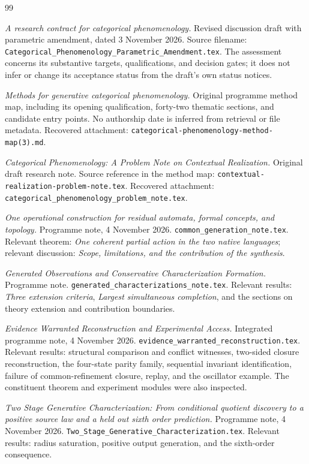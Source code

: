 \documentclass[11pt]{article}
\begin{document}
\begin{thebibliography}{99}

\emph{A research contract for categorical phenomenology.}
Revised discussion draft with parametric amendment, dated 3 November 2026.
Source filename: \texttt{Categorical\_Phenomenology\_Parametric\_Amendment.tex}.
The assessment concerns its substantive targets, qualifications, and decision gates; it does not infer or change its acceptance status from the draft's own status notices.

\emph{Methods for generative categorical phenomenology.}
Original programme method map, including its opening qualification, forty-two thematic sections, and candidate entry points. No authorship date is inferred from retrieval or file metadata.
Recovered attachment: \texttt{categorical-phenomenology-method-map(3).md}.

\emph{Categorical Phenomenology: A Problem Note on Contextual Realization.}
Original draft research note. Source reference in the method map:
\texttt{contextual-realization-problem-note.tex}.
Recovered attachment: \texttt{categorical\_phenomenology\_problem\_note.tex}.

\emph{One operational construction for residual automata, formal concepts, and topology.}
Programme note, 4 November 2026.
\texttt{common\_generation\_note.tex}.
Relevant theorem: \emph{One coherent partial action in the two native languages}; relevant discussion: \emph{Scope, limitations, and the contribution of the synthesis}.

\emph{Generated Observations and Conservative Characterization Formation.}
Programme note.
\texttt{generated\_characterizations\_note.tex}.
Relevant results: \emph{Three extension criteria}, \emph{Largest simultaneous completion}, and the sections on theory extension and contribution boundaries.

\emph{Evidence Warranted Reconstruction and Experimental Access.}
Integrated programme note, 4 November 2026.
\texttt{evidence\_warranted\_reconstruction.tex}.
Relevant results: structural comparison and conflict witnesses, two-sided closure reconstruction, the four-state parity family, sequential invariant identification, failure of common-refinement closure, replay, and the oscillator example.
The constituent theorem and experiment modules were also inspected.

\emph{Two Stage Generative Characterization: From conditional quotient discovery to a positive source law and a held out sixth order prediction.}
Programme note, 4 November 2026.
\texttt{Two\_Stage\_Generative\_Characterization.tex}.
Relevant results: radius saturation, positive output generation, and the sixth-order consequence.


\end{thebibliography}
\end{document}
